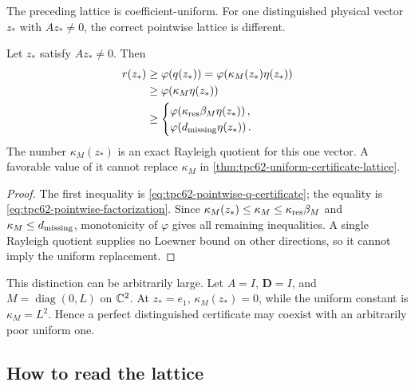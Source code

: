 The preceding lattice is coefficient-uniform.  For one distinguished
physical vector \(z_*\) with \(Az_*\ne0\), the correct pointwise lattice
is different.

\begin{proposition}
\label{prop:tpc62-distinguished-certificate-lattice}
Let \(z_*\) satisfy \(Az_*\ne0\).  Then
\begin{align}
 r(z_*)
 &\ge\varphi(q(z_*))
  =\varphi\!\left(\kappa_M(z_*)\eta(z_*)\right)
 \label{eq:tpc62-distinguished-exact-q}\\
 &\ge\varphi\!\left(\kappa_M\eta(z_*)\right)
 \notag\\
 &\ge
 \begin{cases}
  \varphi\!\left(
   \kappa_{\rm res}\beta_M\eta(z_*)
  \right),\\
  \varphi\!\left(
   d_{\rm missing}\eta(z_*)
  \right).
 \end{cases}
 \label{eq:tpc62-distinguished-lattice}
\end{align}
The number \(\kappa_M(z_*)\) is an exact Rayleigh quotient for this one
vector.  A favorable value of it cannot replace \(\kappa_M\) in
\cref{thm:tpc62-uniform-certificate-lattice}.
\end{proposition}

\begin{proof}
The first inequality is
\eqref{eq:tpc62-pointwise-q-certificate}; the equality is
\eqref{eq:tpc62-pointwise-factorization}.  Since
\(\kappa_M(z_*)\le\kappa_M\le
\kappa_{\rm res}\beta_M\) and
\(\kappa_M\le d_{\rm missing}\), monotonicity of \(\varphi\) gives all
remaining inequalities.  A single Rayleigh quotient supplies no Loewner
bound on other directions, so it cannot imply the uniform replacement.
\end{proof}

This distinction can be arbitrarily large.  Let \(A=I\),
\(\mathbf D=I\), and
\(M=\operatorname{diag}(0,L)\) on \(\mathbb C^2\).  At
\(z_*=e_1\), \(\kappa_M(z_*)=0\), while the uniform constant is
\(\kappa_M=L^2\).  Hence a perfect distinguished certificate may coexist
with an arbitrarily poor uniform one.

\subsection{How to read the lattice}


